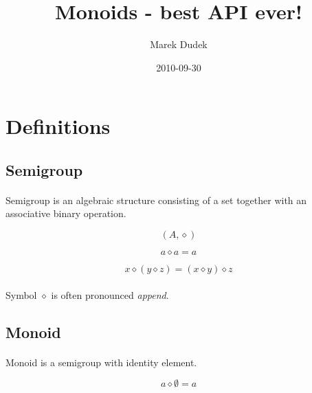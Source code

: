 \documentclass{article}
\title{Monoids - best API ever!}
\date{2010-09-30}
\author{Marek Dudek}
\begin{document}
\maketitle

\newpage
\tableofcontents

\newpage
{}

\section{Definitions}

\subsection{Semigroup}

    \paragraph{}
    Semigroup is an algebraic structure consisting of a set together with an associative binary operation.

    \begin{equation}
        (A, \diamond)
    \end{equation}

    \begin{equation}
        a \diamond a = a
    \end{equation}

    \begin{equation}
        x \diamond (y \diamond z) = (x \diamond y) \diamond z
    \end{equation}

    \paragraph{}
    Symbol $\diamond$ is often pronounced \textit{append}.

\subsection{Monoid}

    \paragraph{}
    Monoid is a semigroup with identity element.

    \begin{equation}
        a \diamond \emptyset = a
    \end{equation}
\end{document}
